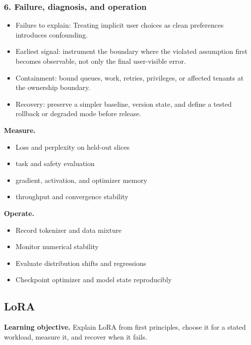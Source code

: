 \subsubsection*{6. Failure, diagnosis, and operation}
\begin{itemize}
\item Failure to explain: Treating implicit user choices as clean preferences introduces confounding.
\item Earliest signal: instrument the boundary where the violated assumption first becomes observable, not only the final user-visible error.
\item Containment: bound queues, work, retries, privileges, or affected tenants at the ownership boundary.
\item Recovery: preserve a simpler baseline, version state, and define a tested rollback or degraded mode before release.
\end{itemize}
\textbf{Measure.}\begin{itemize}
\item Loss and perplexity on held-out slices
\item task and safety evaluation
\item gradient, activation, and optimizer memory
\item throughput and convergence stability
\end{itemize}
\textbf{Operate.}\begin{itemize}
\item Record tokenizer and data mixture
\item Monitor numerical stability
\item Evaluate distribution shifts and regressions
\item Checkpoint optimizer and model state reproducibly
\end{itemize}
\subsection{LoRA}
\textbf{Learning objective.} Explain LoRA from first principles, choose it for a stated workload, measure it, and recover when it fails.
